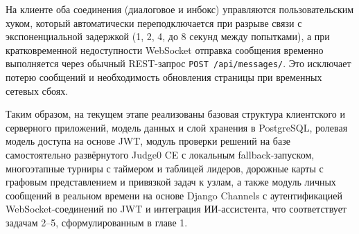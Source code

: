 На клиенте оба соединения (диалоговое и инбокс) управляются
пользовательским хуком, который автоматически переподключается при
разрыве связи с экспоненциальной задержкой (1, 2, 4, до 8 секунд между
попытками), а при кратковременной недоступности WebSocket отправка
сообщения временно выполняется через обычный REST-запрос
\texttt{POST /api/messages/}. Это исключает потерю сообщений и
необходимость обновления страницы при временных сетевых сбоях.

Таким образом, на текущем этапе реализованы базовая структура клиентского
и серверного приложений, модель данных и слой хранения в PostgreSQL,
ролевая модель доступа на основе JWT, модуль проверки решений на базе
самостоятельно развёрнутого Judge0 CE с локальным fallback-запуском,
многоэтапные турниры с таймером и таблицей лидеров, дорожные карты с
графовым представлением и привязкой задач к узлам, а также модуль
личных сообщений в реальном времени на основе Django Channels с
аутентификацией WebSocket-соединений по JWT и интеграция
ИИ-ассистента, что соответствует задачам 2--5, сформулированным в
главе 1.
